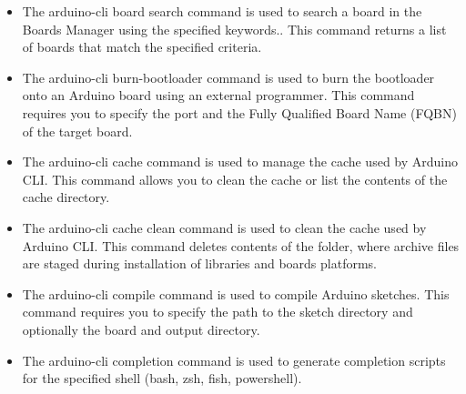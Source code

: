 \begin{itemize}
    \item {}
    
    The arduino-cli board search command is used to search a board in the Boards Manager using the specified keywords.. This command returns a list of boards that match the specified criteria.
    
    
    \item {}
    
    The arduino-cli burn-bootloader command is used to burn the bootloader onto an Arduino board using an external programmer. This command requires you to specify the port and the Fully Qualified Board Name (FQBN) of the target board.
    
    
    
    \item {}
    
    The arduino-cli cache command is used to manage the cache used by Arduino CLI. This command allows you to clean the cache or list the contents of the cache directory.
    
    
    \item {}
    
    The arduino-cli cache clean command is used to clean the cache used by Arduino CLI. This command deletes contents of the  folder, where archive files are staged during installation of libraries and boards platforms.
    
    
    \item {}
    
    The arduino-cli compile command is used to compile Arduino sketches. This command requires you to specify the path to the sketch directory and optionally the board and output directory.
    
    
    \item {}
    
    The arduino-cli completion command is used to generate completion scripts for the specified shell (bash, zsh, fish, powershell).
    

\end{itemize}
